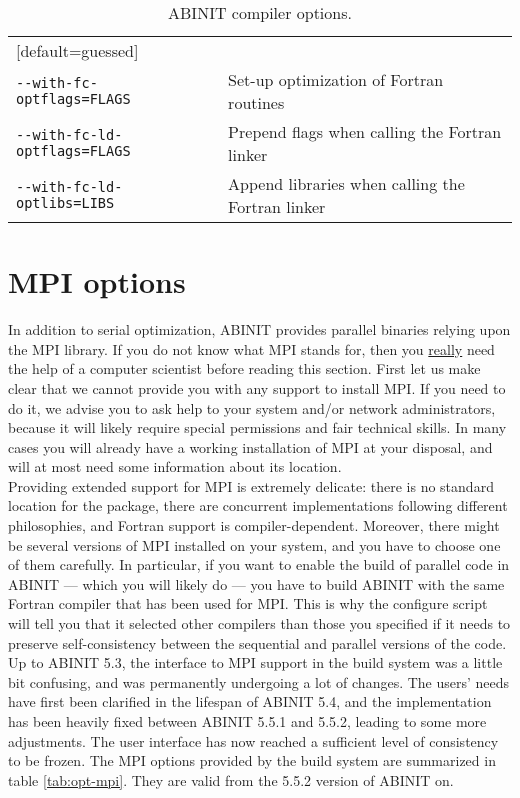 \begin{table}
\begin{center}
\begin{tabular}{|l|p{9cm}|}
                                        [default=guessed] \\
\texttt{-{-}with-fc-optflags=FLAGS}     & Set-up optimization of Fortran routines \\
\texttt{-{-}with-fc-ld-optflags=FLAGS}  & Prepend flags when calling the Fortran linker \\
\texttt{-{-}with-fc-ld-optlibs=LIBS}  & Append libraries when calling the Fortran linker \\
\hline
\end{tabular}
\end{center}
\caption{ABINIT compiler options.}
\label{tab:opt-compilers}
\end{table}

\section{MPI options}

In addition to serial optimization, ABINIT provides parallel binaries
relying upon the MPI library. If you do not know what MPI stands for,
then you \underline{really} need the help of a computer scientist before
reading this section.  First let us make clear that we cannot provide
you with any support to install MPI. If you need to do it, we advise you
to ask help to your system and/or network administrators, because it
will likely require special permissions and fair technical skills.  In
many cases you will already have a working installation of MPI at your
disposal, and will at most need some information about its location.
\\

Providing extended support for MPI is extremely delicate: there is no
standard location for the package, there are concurrent implementations
following different philosophies, and Fortran support is
compiler-dependent.  Moreover, there might be several versions of MPI
installed on your system, and you have to choose one of them carefully.
In particular, if you want to enable the build of parallel code in
ABINIT --- which you will likely do --- you have to build ABINIT with
the same Fortran compiler that has been used for MPI. This is why the
configure script will tell you that it selected other compilers than
those you specified if it needs to preserve self-consistency between the
sequential and parallel versions of the code.
\\

Up to ABINIT 5.3, the interface to MPI support in the build system
was a little bit confusing, and was permanently undergoing a lot of
changes. The users' needs have first been clarified in the lifespan of
ABINIT 5.4, and the implementation has been heavily fixed between ABINIT
5.5.1 and 5.5.2, leading to some more adjustments. The user interface
has now reached a sufficient level of consistency to be frozen.
The MPI options provided by the build system are summarized in table
\ref{tab:opt-mpi}. They are valid from the 5.5.2 version of ABINIT on.
\\


